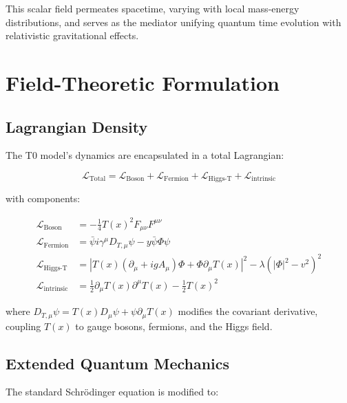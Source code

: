 \documentclass[aps,prl,twocolumn,superscriptaddress,nofootinbib]{revtex4-2}
\newcommand{\Tfield}{T(x)}
\newcommand{\DhiggsT}{\Tfield (\partial_\mu + ig A_\mu) \Phi + \Phi \partial_\mu \Tfield}
\newcommand{\DTmu}{D_{T,\mu}}
\begin{document}
	This scalar field permeates spacetime, varying with local mass-energy distributions, and serves as the mediator unifying quantum time evolution with relativistic gravitational effects.
	
	\section{Field-Theoretic Formulation}
	\label{sec:field_theory}
	
	\subsection{Lagrangian Density}
	\label{subsec:lagrangian}
	
	The T0 model's dynamics are encapsulated in a total Lagrangian:
	
	\begin{equation}
		\mathcal{L}_{\text{Total}} = \mathcal{L}_{\text{Boson}} + \mathcal{L}_{\text{Fermion}} + \mathcal{L}_{\text{Higgs-T}} + \mathcal{L}_{\text{intrinsic}}
		\label{eq:total_lagrangian}
	\end{equation}
	
	with components:
	
	\begin{equation}
		\begin{aligned}
			\mathcal{L}_{\text{Boson}} &= -\frac{1}{4}\Tfield^2 F_{\mu\nu}F^{\mu\nu} \\
			\mathcal{L}_{\text{Fermion}} &= \bar{\psi}i\gamma^{\mu}\DTmu\psi - y\bar{\psi}\Phi\psi \\
			\mathcal{L}_{\text{Higgs-T}} &= |\DhiggsT|^2 - \lambda(|\Phi|^2 - v^2)^2 \\
			\mathcal{L}_{\text{intrinsic}} &= \frac{1}{2}\partial_{\mu}\Tfield\partial^{\mu}\Tfield - \frac{1}{2}\Tfield^2
		\end{aligned}
		\label{eq:component_lagrangians}
	\end{equation}
	
	where $\DTmu\psi = \Tfield D_{\mu}\psi + \psi\partial_{\mu}\Tfield$ modifies the covariant derivative, coupling $\Tfield$ to gauge bosons, fermions, and the Higgs field.
	
	\subsection{Extended Quantum Mechanics}
	\label{subsec:qm_extension}
	
	The standard Schrödinger equation is modified to:
	
\end{document}
